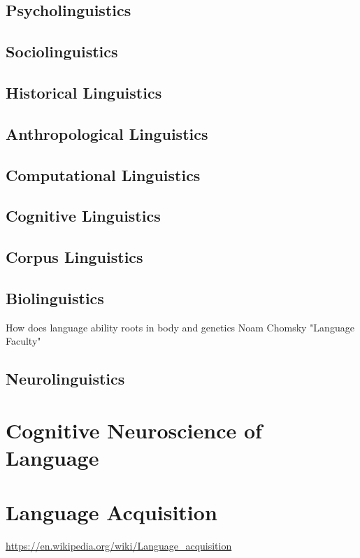     
    \subsection{Psycholinguistics}
    
    
    \subsection{Sociolinguistics}
    
    
    \subsection{Historical Linguistics}
    
    
    \subsection{Anthropological Linguistics}
    
    
    \subsection{Computational Linguistics}
    
    
    \subsection{Cognitive Linguistics}
    
    
    \subsection{Corpus Linguistics}
    
    
    \subsection{Biolinguistics}
        How does language ability roots in body and genetics
        Noam Chomsky "Language Faculty"
    
    
    \subsection{Neurolinguistics}
    
    
\section{Cognitive Neuroscience of Language}


\section{Language Acquisition}
    \url{https://en.wikipedia.org/wiki/Language_acquisition}
    
    
    